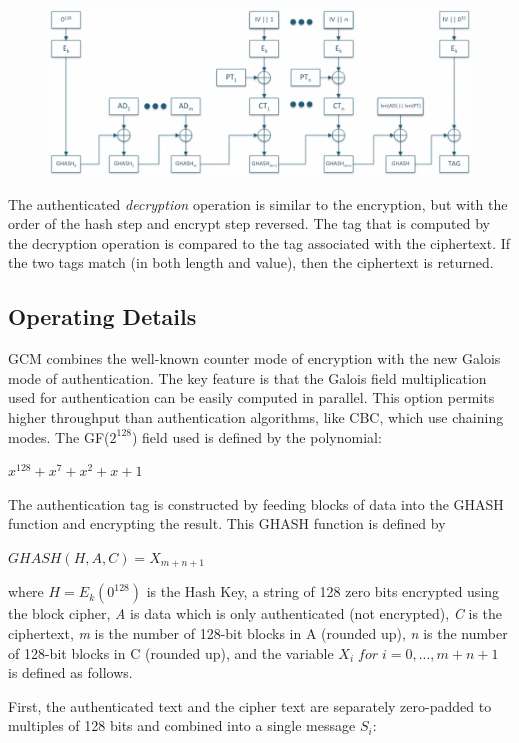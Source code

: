 \documentclass[11pt]{article}
\begin{document}
\begin{figure}[!ht]
  \includegraphics[width=1\textwidth]{pic1-hw3-1635747}
  \label{fig:GCM2}
\end{figure}
The authenticated {\em decryption} operation is similar to the encryption, but with the order of the hash step and encrypt step reversed. The tag that is computed by the decryption operation is compared to the tag associated with the ciphertext. If the two tags match (in both length and value), then the ciphertext is returned.

\subsection{Operating Details}
GCM combines the well-known counter mode of encryption with the new Galois mode of authentication. The key feature is that the Galois field multiplication used for authentication can be easily computed in parallel. This option permits higher throughput than authentication algorithms, like CBC, which use chaining modes. The GF($2^{128}$) field used is defined by the polynomial:

\bigskip
$ x^{128} + x^7 + x^2 + x + 1 $
\bigskip

The authentication tag is constructed by feeding blocks of data into the GHASH function and encrypting the result. This GHASH function is defined by

\bigskip
$ GHASH(H,A,C)=X_{m+n+1} $
\bigskip

where $ H = E_k(0^{128}) $ is the Hash Key, a string of 128 zero bits encrypted using the block cipher, {\em A} is data which is only authenticated (not encrypted), {\em C} is the ciphertext, {\em m} is the number of 128-bit blocks in A (rounded up), {\em n} is the number of 128-bit blocks in C (rounded up), and the variable $ X_i\;for\;i = 0, ..., m + n + 1 $ is defined as follows.

First, the authenticated text and the cipher text are separately zero-padded to multiples of 128 bits and combined into a single message $S_i$:
\end{document}
